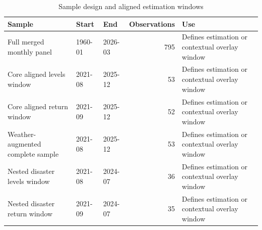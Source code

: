 \begin{table}
\caption{Sample design and aligned estimation windows}
\label{tab:sample_design}
\begin{tabular}{lllrl}
\toprule
Sample & Start & End & Observations & Use \\
\midrule
Full merged monthly panel & 1960-01 & 2026-03 & 795 & Defines estimation or contextual overlay window \\
Core aligned levels window & 2021-08 & 2025-12 & 53 & Defines estimation or contextual overlay window \\
Core aligned return window & 2021-09 & 2025-12 & 52 & Defines estimation or contextual overlay window \\
Weather-augmented complete sample & 2021-08 & 2025-12 & 53 & Defines estimation or contextual overlay window \\
Nested disaster levels window & 2021-08 & 2024-07 & 36 & Defines estimation or contextual overlay window \\
Nested disaster return window & 2021-09 & 2024-07 & 35 & Defines estimation or contextual overlay window \\
\bottomrule
\end{tabular}
\end{table}

